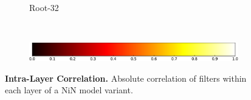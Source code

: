 \documentclass[thesis]{subfiles}
\begin{document}
{\begin{landscape}
\begin{figure}[p]
\begin{subfigure}[c]{0.75\paperheight}
					~
					~
					~
					~
					\caption{Root-32}\label{fig:corrroot32}
					\vspace*{0.6em}
				\end{subfigure}\\
				\begin{subfigure}[c]{0.77\paperheight}
    				\centering
	    			\includegraphics[width=0.4\linewidth]{Figs/PDF/colorbar}
				\end{subfigure}
				\caption[Intra-layer filter correlation]{\textbf{ Intra-Layer Correlation.} Absolute correlation of filters within each layer of a NiN model variant.}
				\label{fig:nincorr}
			\end{figure}
		\end{landscape}
		\begin{landscape}
			\begin{figure}[p]
				\begin{subfigure}[c]{0.88\paperheight}

\end{subfigure}
\end{figure}
\end{landscape}}
\end{document}
